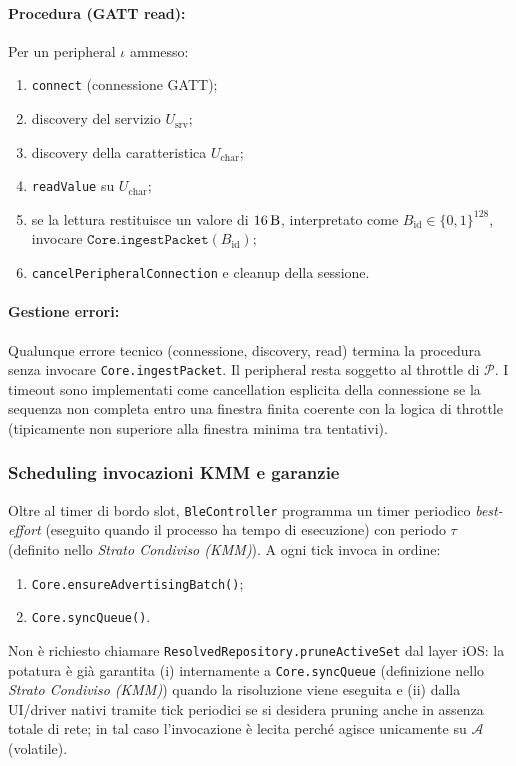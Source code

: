 \documentclass[a4paper,11pt,table,dvipsnames]{article}
\begin{document}
\paragraph{Procedura (GATT read):}
Per un peripheral \(\iota\) ammesso:
\begin{enumerate}
    \item \texttt{connect} (connessione GATT);
    \item discovery del servizio \(U_{\text{srv}}\);
    \item discovery della caratteristica \(U_{\text{char}}\);
    \item \texttt{readValue} su \(U_{\text{char}}\);
    \item se la lettura restituisce un valore di \(\SI{16}{\byte}\), interpretato come \(B_{\text{id}}\in\{0,1\}^{128}\), invocare \(\texttt{Core.ingestPacket}(B_{\text{id}})\);
    \item \texttt{cancelPeripheralConnection} e cleanup della sessione.
\end{enumerate}

\paragraph{Gestione errori:}
Qualunque errore tecnico (connessione, discovery, read) termina la procedura senza invocare \texttt{Core.ingestPacket}. Il peripheral resta soggetto al throttle di \(\mathcal{P}\). I timeout sono implementati come cancellation esplicita della connessione se la sequenza non completa entro una finestra finita coerente con la logica di throttle (tipicamente non superiore alla finestra minima tra tentativi).

\subsubsection{Scheduling invocazioni KMM e garanzie}
Oltre al timer di bordo slot, \texttt{BleController} programma un timer periodico \emph{best-effort} (eseguito quando il processo ha tempo di esecuzione) con periodo \(\tau\) (definito nello \emph{Strato Condiviso (KMM)}). A ogni tick invoca in ordine:
\begin{enumerate}
    \item \texttt{Core.ensureAdvertisingBatch()};
    \item \texttt{Core.syncQueue()}.
\end{enumerate}
Non è richiesto chiamare \texttt{ResolvedRepository.pruneActiveSet} dal layer iOS: la potatura è già garantita (i) internamente a \texttt{Core.syncQueue} (definizione nello \emph{Strato Condiviso (KMM)}) quando la risoluzione viene eseguita e (ii) dalla UI/driver nativi tramite tick periodici se si desidera pruning anche in assenza totale di rete; in tal caso l’invocazione è lecita perché agisce unicamente su \(\mathcal{A}\) (volatile).
\end{document}
